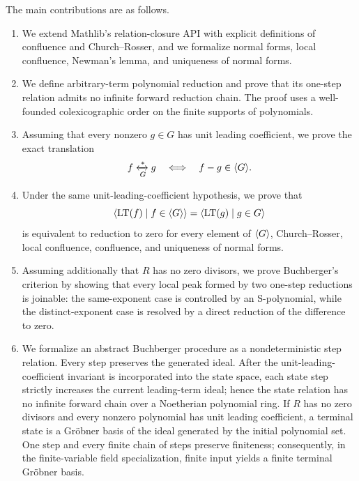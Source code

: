 The main contributions are as follows.
\begin{enumerate}[label=(\roman*),leftmargin=2.2em]
  \item We extend Mathlib's relation-closure API with explicit definitions of
    confluence and Church--Rosser, and we formalize normal forms, local
    confluence, Newman's lemma, and uniqueness of normal forms.
  \item We define arbitrary-term polynomial reduction and prove that its
    one-step relation admits no infinite forward reduction chain.  The proof
    uses a well-founded colexicographic order on the finite supports of
    polynomials.
  \item Assuming that every nonzero $g\in G$ has unit leading coefficient,
    we prove the exact translation
    \[
      f\xleftrightarrow[G]{*}g
      \quad\Longleftrightarrow\quad
      f-g\in\langle G \rangle.
    \]
  \item Under the same unit-leading-coefficient hypothesis, we prove that
    \[
      \langle \operatorname{LT}(f)\mid f\in\langle G \rangle \rangle
      = \langle \operatorname{LT}(g)\mid g\in G \rangle
    \]
    is equivalent to reduction to zero for every element of $\langle G \rangle$,
    Church--Rosser, local confluence, confluence, and uniqueness of normal
    forms.
  \item Assuming additionally that $R$ has no zero divisors, we prove
    Buchberger's criterion by showing that every local peak formed by two
    one-step reductions is joinable: the same-exponent case is controlled by
    an S-polynomial, while the distinct-exponent case is resolved by a direct
    reduction of the difference to zero.
  \item We formalize an abstract Buchberger procedure as a nondeterministic
    step relation.  Every step preserves the generated ideal.  After the
    unit-leading-coefficient invariant is incorporated into the state space,
    each state step strictly increases the current leading-term ideal; hence
    the state relation has no infinite forward chain over a Noetherian
    polynomial ring.  If $R$ has no zero divisors and every nonzero polynomial
    has unit leading coefficient, a terminal state is a Gr\"obner basis of
    the ideal generated by the initial polynomial set.  One step and every
    finite chain of steps preserve finiteness; consequently, in the
    finite-variable field specialization, finite input yields a finite terminal
    Gr\"obner basis.
\end{enumerate}

